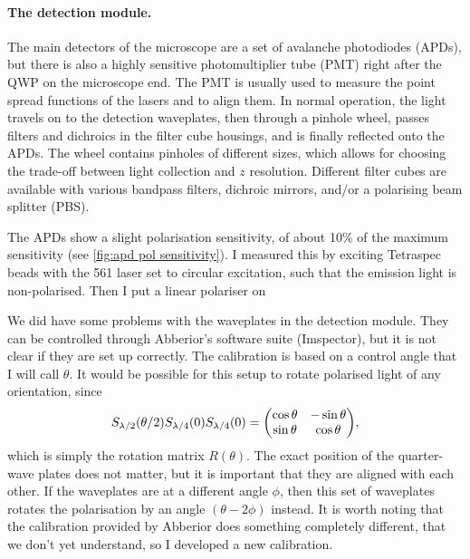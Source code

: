 
\paragraph{The detection module.} The main detectors of the microscope are a set of avalanche photodiodes (APDs), but there is also a highly sensitive photomultiplier tube (PMT) right after the QWP on the microscope end. The PMT is usually used to measure the point spread functions of the lasers and to align them. In normal operation, the light travels on to the detection waveplates, then through a pinhole wheel, passes filters and dichroics in the filter cube housings, and is finally reflected onto the APDs. The wheel contains pinholes of different sizes, which allows for choosing the trade-off between light collection and $ z $ resolution. Different filter cubes are available with various bandpass filters, dichroic mirrors, and/or a polarising beam splitter (PBS).

The APDs show a slight polarisation sensitivity, of about 10\% of the maximum sensitivity (see \autoref{fig:apd pol sensitivity}). I measured this by exciting Tetraspec beads with the 561 laser set to circular excitation, such that the emission light is non-polarised. Then I put a linear polariser on  

We did have some problems with the waveplates in the detection module. They can be controlled through Abberior's software suite (Imspector), but it is not clear if they are set up correctly. The calibration is based on a control angle that I will call $ \theta $. It would be possible for this setup to rotate polarised light of any orientation, since
\begin{equation}
	S_\hwp(\theta/2) S_\qwp(0) S_\qwp(0) = \mqty(\cos\theta & -\sin\theta \\ \sin\theta & \cos\theta ),
\end{equation}
which is simply the rotation matrix $ R(\theta) $. The exact position of the quarter-wave plates does not matter, but it is important that they are aligned with each other. If the waveplates are at a different angle $ \phi $, then this set of waveplates rotates the polarisation by an angle $ (\theta-2\phi) $ instead. It is worth noting that the calibration provided by Abberior does something completely different, that we don't yet understand, so I developed a new calibration.

